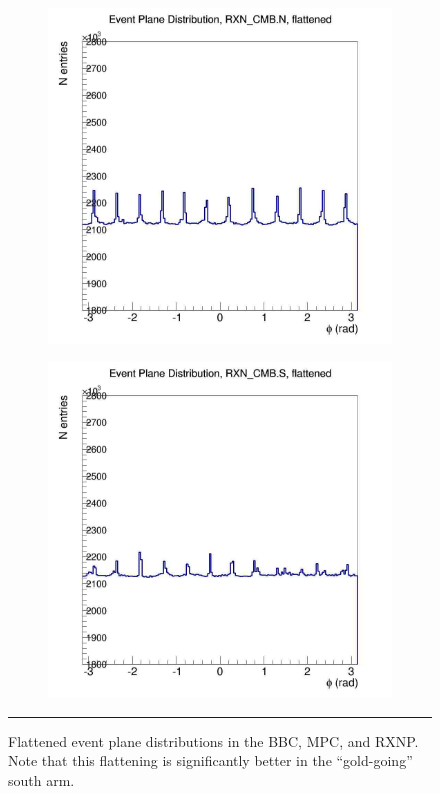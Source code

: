 \begin{figure}[htbp!]
\begin{subfigure}[p]{0.4\textwidth}
    \end{subfigure}
    \begin{subfigure}[p]{0.4\textwidth}
    \includegraphics[width=1\textwidth]{EPflattening/flatrxncmbn.jpg}
    \end{subfigure}
    \begin{subfigure}[p]{0.4\textwidth}
    \includegraphics[width=1\textwidth]{EPflattening/flatrxncmbs.jpg}
    \end{subfigure}
    \rule{35em}{0.5pt}
  \caption[Flattened event plane distributions in the BBC, MPC, and RXNP]{Flattened event plane distributions in the BBC, MPC, and RXNP. Note that this flattening is significantly better in the ``gold-going'' south arm.}
  \label{fig:evtpln}
\end{figure}

